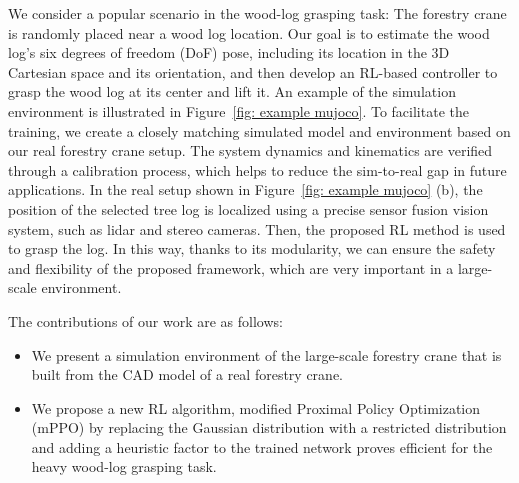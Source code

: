 \begin{figure*}
\centering
\label{fig:rotbot1}
\vspace{2ex}
\caption{(a) Snapshot of the simulated environment. While the logs' length is fixed to $l=\SI{2.75}{\meter}$, their diameters are varied in the range $d=[0.3,\:0.8]$ \SI{}{\meter}, (b) Real crane setup in outdoor environment.}
\label{fig: example mujoco}
\vspace{-0.2ex}
\end{figure*}

We consider a popular scenario in the wood-log grasping task: The forestry crane is randomly placed near a wood log location. Our goal is to estimate the wood log's six degrees of freedom (DoF) pose, including its location in the 3D Cartesian space and its orientation, and then develop an RL-based controller to grasp the wood log at its center and lift it. 
An example of the simulation environment is illustrated in Figure~\ref{fig: example mujoco}. 
To facilitate the training, we create a closely matching simulated model and environment based on our real forestry crane setup. The system dynamics and kinematics are verified through a calibration process, which helps to reduce the sim-to-real gap in future applications. 
In the real setup shown in Figure~\ref{fig: example mujoco} (b), the position of the selected tree log is localized using a precise sensor fusion vision system, such as lidar and stereo cameras. Then, the proposed RL method is used to grasp the log. In this way, thanks to its modularity, we can ensure the safety and flexibility of the proposed framework, which are very important in a large-scale environment. 


The contributions of our work are as follows:
\begin{itemize}
    \item We present a simulation environment of the large-scale forestry crane that is built from the CAD model of a real forestry crane. 
    \item We propose a new RL algorithm, modified Proximal Policy Optimization (mPPO) by replacing the Gaussian distribution with a restricted distribution and adding a heuristic factor to the trained network proves efficient for the heavy wood-log grasping task. 
\end{itemize}


